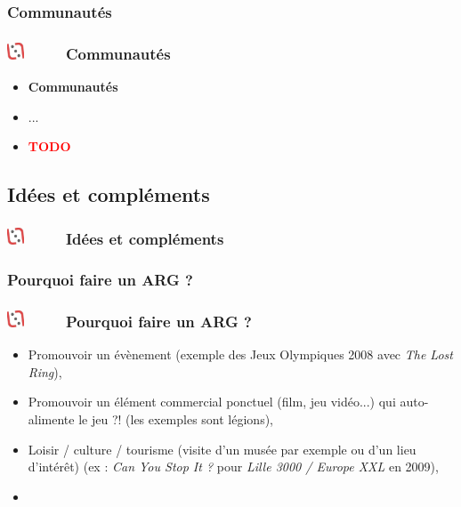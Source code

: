 \documentclass[slidetop,11pt]{beamer}
\def\moreInFrameTitleLeftt{\includegraphics[height=0.5cm]{img/ligueludique-0.png}~~~~~}
\begin{document}
\def\sectionPartIIbV{Communaut{\'e}s}
\subsubsection{\sectionPartIIbV} %
\begin{frame}
	\frametitle{\moreInFrameTitleLeftt \sectionPartIIbV }
	\begin{itemize}
		\item \textbf{ \sectionPartIIbV }
		\item[] ...
		\item \textcolor{red}{ \textbf{TODO} }
	\end{itemize}
\end{frame} 


\def\sectionPartIIc{Id{\'e}es et compl{\'e}ments}
\subsection{\sectionPartIIc} %
\begin{frame}
	\frametitle{\moreInFrameTitleLeftt \sectionPartIIc }
	\tableofcontents[sections=2,currentsection,subsectionstyle=show/shaded/hide]
\end{frame} 

\def\sectionPartIIcI{Pourquoi faire un ARG ?}
\subsubsection{\sectionPartIIcI} %
\begin{frame}
	\frametitle{\moreInFrameTitleLeftt \sectionPartIIcI }
	\begin{itemize}
		\item Promouvoir un {\'e}v{\`e}nement (exemple des Jeux Olympiques 2008 avec \emph{The Lost Ring}), 
		\item Promouvoir un {\'e}l{\'e}ment commercial ponctuel (film, jeu vid{\'e}o...) qui auto-alimente le jeu ?! (les exemples sont l{\'e}gions), 
		\item Loisir / culture / tourisme (visite d'un mus{\'e}e par exemple ou d'un lieu d'int{\'e}r{\^e}t) (ex : \emph{Can You Stop It ?} pour \emph{Lille 3000 / Europe XXL} en 2009), 
		\item 
	\end{itemize}
\end{frame} 

\def\sectionPartIIcII{Parall{\`e}le avec le JdR / Jeu de R{\^o}le}
\end{document}
